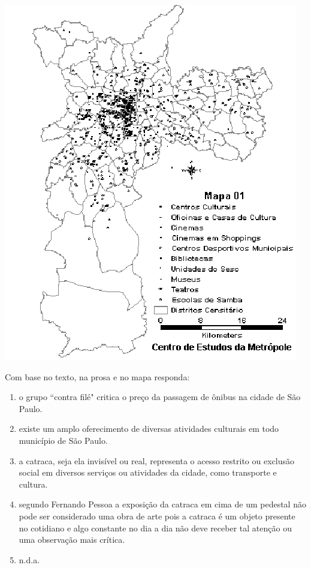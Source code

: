 \documentclass[10pt,a4paper]{article}
\newenvironment{Figure}
  {\par\medskip\noindent\minipage{\linewidth}}
  {\endminipage\par\medskip}
\begin{document}
\begin{multicols}{2}
\begin{enumerate}
\begin{Figure}
     \includegraphics[width=\linewidth]{mapa_sao_paulo_geografia.jpg}
\end{Figure}
	
	Com base no texto, na prosa e  no mapa responda:

	\begin{enumerate}
		\item o grupo ``contra fil\'e" critica o pre\c{c}o da passagem de ônibus na cidade de S\~ao Paulo.
		\item existe um amplo oferecimento de diversas atividades culturais em todo munic\'ipio de S\~ao Paulo.
		\item a catraca, seja ela invis\'ivel ou real, representa o acesso restrito ou exclus\~ao social em diversos servi\c{c}os ou atividades da cidade, como transporte e cultura.
		\item segundo Fernando Pessoa a exposi\c{c}\~ao da catraca em cima de um pedestal n\~ao pode ser considerado uma obra de arte pois a catraca \'e um objeto presente no cotidiano e algo constante no dia a dia n\~ao deve receber tal aten\c{c}\~ao ou uma observa\c{c}\~ao mais cr\'itica.
		\item n.d.a.
	\end{enumerate}




\end{enumerate}
\end{multicols}
\end{document}
